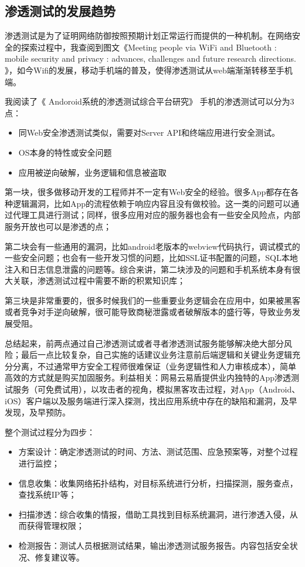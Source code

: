 \documentclass{article}
\begin{document}
\subsection{渗透测试的发展趋势}
渗透测试是为了证明网络防御按照预期计划正常运行而提供的一种机制。在网络安全的探索过程中，我查阅到图文《Meeting people via WiFi and Bluetooth : mobile security and privacy : advances, challenges and future research directions.
》\citep{RokachMobile}，如今Wifi的发展，移动手机端的普及，使得渗透测试从web端渐渐转移至手机端。\par
我阅读了《 Andoroid系统的渗透测试综合平台研究》 \citep{2018Android}手机的渗透测试可以分为3点：\par

\begin{itemize}
	\item 同Web安全渗透测试类似，需要对Server API和终端应用进行安全测试。 
	\item OS本身的特性或安全问题
	\item 应用被逆向破解，业务逻辑和信息被盗取
\end{itemize}
第一块，很多做移动开发的工程师并不一定有Web安全的经验。很多App都存在各种逻辑漏洞，比如App的流程依赖于响应内容且没有做校验。这一类的问题可以通过代理工具进行测试；同样，很多应用对应的服务器也会有一些安全风险点，内部服务开放也可以是渗透的点；\par
第二块会有一些通用的漏洞，比如android老版本的webview代码执行，调试模式的一些安全问题；也会有一些开发习惯的问题，比如SSL证书配置的问题，SQL本地注入和日志信息泄露的问题等。综合来讲，第二块涉及的问题和手机系统本身有很大关联，渗透测试过程中需要不断的积累知识库；\par
第三块是非常重要的，很多时候我们的一些重要业务逻辑会在应用中，如果被黑客或者竞争对手逆向破解，很可能导致商秘泄露或者破解版本的盛行等，导致业务发展受阻。\par

总结起来，前两点通过自己渗透测试或者寻者渗透测试服务能够解决绝大部分风险；最后一点比较复杂，自己实施的话建议业务注意前后端逻辑和关键业务逻辑充分分离，不过通常甲方安全工程师很难保证（业务逻辑性和人力审核成本），简单高效的方式就是购买加固服务。利益相关：网易云易盾提供业内独特的App渗透测试服务（可免费试用），以攻击者的视角，模拟黑客攻击过程，对App（Android、iOS）客户端以及服务端进行深入探测，找出应用系统中存在的缺陷和漏洞，及早发现，及早预防。\par
整个测试过程分为四步：\par
\begin{itemize}
	\item 方案设计：确定渗透测试的时间、方法、测试范围、应急预案等，对整个过程进行监控；
	\item 信息收集：收集网络拓扑结构，对目标系统进行分析，扫描探测，服务查点，查找系统IP等；
	\item 扫描渗透：综合收集的情报，借助工具找到目标系统漏洞，进行渗透入侵，从而获得管理权限；
	\item 检测报告：测试人员根据测试结果，输出渗透测试服务报告。内容包括安全状况、修复建议等。
\end{itemize}
\end{document}

